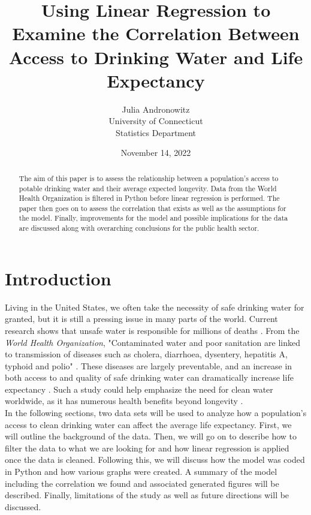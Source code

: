 \documentclass[12pt]{article}
\title{Using Linear Regression to Examine the Correlation Between Access to Drinking Water and Life Expectancy}
\author{Julia Andronowitz\\
University of Connecticut\\Statistics Department}
\date{November 14, 2022}
\begin{document}
\maketitle

\begin{abstract}

\noindent
The aim of this paper is to assess the relationship between a population's access to potable drinking water and their average expected longevity. Data from the World Health Organization is filtered in Python before linear regression is performed. The paper then goes on to assess the correlation that exists as well as the assumptions for the model. Finally, improvements for the model and possible implications for the data are discussed along with overarching conclusions for the public health sector.

\end{abstract}

\section{Introduction}

\noindent
Living in the United States, we often take the necessity of safe drinking water for granted, but it is still a pressing issue in many parts of the world. Current research shows that unsafe water is responsible for millions of deaths \citep{ritchieroser2019water}. From the \textit{World Health Organization}, "Contaminated water and poor sanitation are linked to transmission of diseases such as cholera, diarrhoea, dysentery, hepatitis A, typhoid and polio" \citep{who2017water}. These diseases are largely preventable, and an increase in both access to and quality of safe drinking water can dramatically increase life expectancy \citep{angelakis2021quality}. Such a study could help emphasize the need for clean water worldwide, as it has numerous health benefits beyond longevity \citep{popkin2010waterhealth}. \\

\noindent
In the following sections, two data sets will be used to analyze how a population's access to clean drinking water can affect the average life expectancy. First, we will outline the background of the data. Then, we will go on to describe how to filter the data to what we are looking for and how linear regression is applied once the data is cleaned. Following this, we will discuss how the model was coded in Python and how various graphs were created. A summary of the model including the correlation we found and associated generated figures will be described. Finally, limitations of the study as well as future directions will be discussed.
\end{document}
